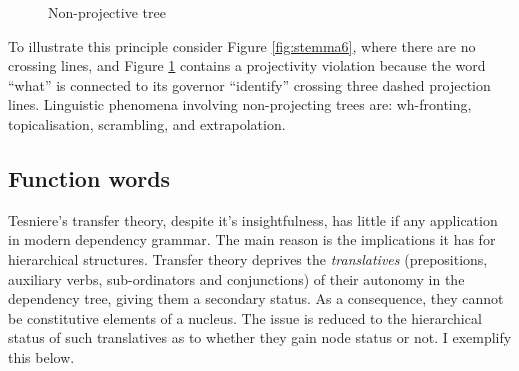     \begin{figure}[!ht]
        \centering
        \caption{Non-projective tree}
        \label{fig:stemma7}
    \end{figure}

    To illustrate this principle consider Figure \ref{fig:stemma6}, where there are no crossing lines, and Figure \ref{fig:stemma7} contains a projectivity violation because the word ``what'' is connected to its governor ``identify'' crossing three dashed projection lines. Linguistic phenomena involving non-projecting trees are: wh-fronting, topicalisation, scrambling, and extrapolation. 

\subsection{Function words}
    Tesniere's transfer theory, despite it's insightfulness, has little if any application in modern dependency grammar. The main reason is the implications it has for hierarchical structures. Transfer theory deprives the \textit{translatives} (prepositions, auxiliary verbs, sub-ordinators and conjunctions) of their autonomy in the dependency tree, giving them a secondary status. As a consequence, they cannot be constitutive elements of a nucleus. The issue is reduced to the hierarchical status of such translatives as to whether they gain node status or not. I exemplify this below. 

